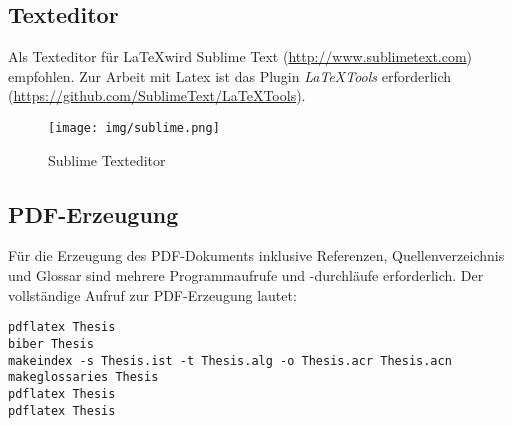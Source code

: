 \subsection{Texteditor}

Als Texteditor für \LaTeX wird Sublime Text (\url{http://www.sublimetext.com}) empfohlen. Zur Arbeit mit Latex ist das Plugin \emph{LaTeXTools} erforderlich (\url{https://github.com/SublimeText/LaTeXTools}).

\begin{figure}[hbt]
\centering
\begin{minipage}[t]{1\textwidth} %
\caption{Sublime Texteditor} %
\texttt{[image: img/sublime.png]}\\ %
\end{minipage}
\end{figure}

\subsection{PDF-Erzeugung}
\label{subsec:pdfErzeugung}
Für die Erzeugung des PDF-Dokuments inklusive Referenzen, Quellenverzeichnis und Glossar sind mehrere Programmaufrufe und -durchläufe erforderlich. Der vollständige Aufruf zur PDF-Erzeugung lautet: 

\texttt{pdflatex Thesis}\\
\texttt{biber Thesis}\\
\texttt{makeindex -s Thesis.ist -t Thesis.alg -o Thesis.acr Thesis.acn}\\
\texttt{makeglossaries Thesis}\\
\texttt{pdflatex Thesis}\\
\texttt{pdflatex Thesis}\\